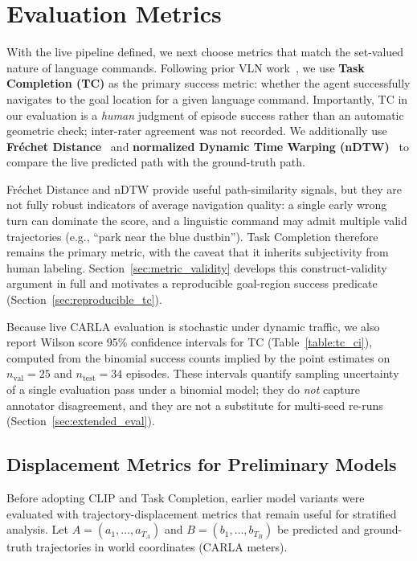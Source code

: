 \section{Evaluation Metrics}
\label{sec:eval_metrics}

With the live pipeline defined, we next choose metrics that match the set-valued nature of language commands. Following prior VLN work~\cite{schumann-riezler-2022-analyzing,xiang-etal-2020-learning,Chen2019TOUCHDOWN}, we use \textbf{Task Completion (TC)} as the primary success metric: whether the agent successfully navigates to the goal location for a given language command. Importantly, TC in our evaluation is a \emph{human} judgment of episode success rather than an automatic geometric check; inter-rater agreement was not recorded. We additionally use \textbf{Fr\'{e}chet Distance}~\cite{eiter1994computing} and \textbf{normalized Dynamic Time Warping (nDTW)}~\cite{ilharco2019general} to compare the live predicted path with the ground-truth path.

Fr\'{e}chet Distance and nDTW provide useful path-similarity signals, but they are not fully robust indicators of average navigation quality: a single early wrong turn can dominate the score, and a linguistic command may admit multiple valid trajectories (e.g., ``park near the blue dustbin''). Task Completion therefore remains the primary metric, with the caveat that it inherits subjectivity from human labeling. Section~\ref{sec:metric_validity} develops this construct-validity argument in full and motivates a reproducible goal-region success predicate (Section~\ref{sec:reproducible_tc}).

Because live CARLA evaluation is stochastic under dynamic traffic, we also report Wilson score 95\% confidence intervals for TC (Table~\ref{table:tc_ci}), computed from the binomial success counts implied by the point estimates on $n_{\mathrm{val}}=25$ and $n_{\mathrm{test}}=34$ episodes. These intervals quantify sampling uncertainty of a single evaluation pass under a binomial model; they do \emph{not} capture annotator disagreement, and they are not a substitute for multi-seed re-runs (Section~\ref{sec:extended_eval}).

\subsection{Displacement Metrics for Preliminary Models}
\label{sec:disp_metrics}

Before adopting CLIP and Task Completion, earlier model variants were evaluated with trajectory-displacement metrics that remain useful for stratified analysis. Let $A=(a_1,\ldots,a_{T_A})$ and $B=(b_1,\ldots,b_{T_B})$ be predicted and ground-truth trajectories in world coordinates (CARLA meters).

